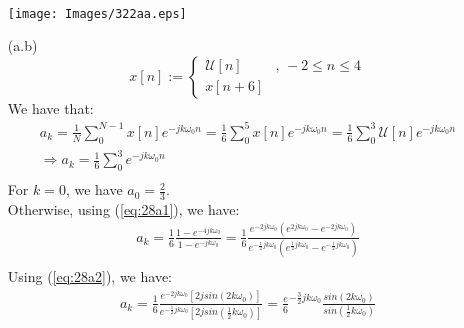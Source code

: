\documentclass{article}
\begin{document}
\begin{enumerate}
\begin{equation*}
\begin{array}{l}
                \end{array}
            \end{equation*}
            \begin{minipage}{\textwidth}
                \centering \texttt{[image: Images/322aa.eps]}
            \end{minipage}
        \item[(a.b)]
            \begin{equation*}
                x[n] := \left\{\begin{array}{ll}
                    \mathcal{U}[n]&\textrm{, } -2 \leq n \leq 4  \\
                    x[n+6]
                \end{array}\right.
            \end{equation*}
            We have that:
            \begin{equation*}
                \begin{array}{l}
                    a_{k} = \frac{1}{N}\sum\limits_{0}^{N-1} x[n]e^{-jk\omega_{0}n} = \frac{1}{6}\sum\limits_{0}^{5} x[n]e^{-jk\omega_{0}n} = \frac{1}{6}\sum\limits_{0}^{3} \mathcal{U}[n]e^{-jk\omega_{0}n}\\
                    \Rightarrow a_{k} = \frac{1}{6}\sum\limits_{0}^{3} e^{-jk\omega_{0}n}  \\
                \end{array}
            \end{equation*}
            For $k = 0$, we have $a_{0} = \frac{2}{3}$. \\
            Otherwise, using (\ref{eq:28a1}), we have:
            \begin{equation*}
                \begin{array}{l}
                    a_{k} = \frac{1}{6}\frac{1-e^{-4jk\omega_{0}}}{1-e^{-jk\omega_{0}}} = \frac{1}{6}\frac{e^{-2jk\omega_{0}}(e^{2jk\omega_{0}}-e^{-2jk\omega_{0}})}{e^{-\frac{1}{2}jk\omega_{0}}(e^{\frac{1}{2}jk\omega_{0}}-e^{-\frac{1}{2}jk\omega_{0}})}  \\
                \end{array}
            \end{equation*}
            Using (\ref{eq:28a2}), we have:
            \begin{equation*}
                \begin{array}{l}
                    a_{k} =  \frac{1}{6}\frac{e^{-2jk\omega_{0}}[2jsin(2k\omega_{0})]}{e^{-\frac{1}{2}jk\omega_{0}}[2jsin(\frac{1}{2}k\omega_{0})]} = \frac{e}{6}^{-\frac{3}{2}jk\omega_{0}}\frac{sin(2k\omega_{0})}{sin(\frac{1}{2}k\omega_{0})}  \\

\end{array}
\end{equation*}
\end{enumerate}
\end{document}
